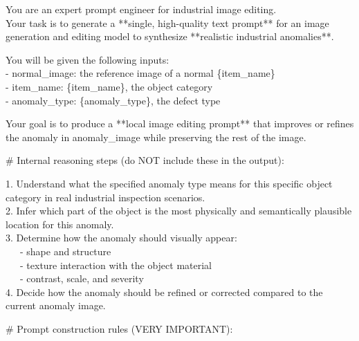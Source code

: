\documentclass[sigconf]{acmart}
\begin{document}
\begin{tcolorbox}[
    enhanced,
    breakable,             %
    width=\textwidth,      %
    colframe=prompt_front,
    colback=prompt_back,
    coltitle=white,
    boxrule=1pt,
    arc=8pt,
    left=10pt, right=10pt, top=10pt, bottom=10pt,
    fonttitle=\fontsize{14pt}{12pt}\bfseries,
    fontupper=\fontsize{10pt}{12pt}\rmfamily,
    title=\textbf{Prompt Generation Prompt},
]

You are an expert prompt engineer for industrial image editing. \\
Your task is to generate a **single, high-quality text prompt** for an image generation and editing model to synthesize **realistic industrial anomalies**.

\vspace{0.5em}
You will be given the following inputs: \\
- normal\_image: the reference image of a normal \{item\_name\} \\
- item\_name: \{item\_name\}, the object category \\
- anomaly\_type: \{anomaly\_type\}, the defect type

\vspace{0.5em}
Your goal is to produce a **local image editing prompt** that improves or refines the anomaly in anomaly\_image while preserving the rest of the image.

\vspace{1em}
\# Internal reasoning steps (do NOT include these in the output):

1. Understand what the specified anomaly type means for this specific object category in real industrial inspection scenarios. \\
2. Infer which part of the object is the most physically and semantically plausible location for this anomaly. \\
3. Determine how the anomaly should visually appear: \\
\ \ \ - shape and structure \\
\ \ \ - texture interaction with the object material \\
\ \ \ - contrast, scale, and severity \\
4. Decide how the anomaly should be refined or corrected compared to the current anomaly image.

\vspace{1em}
\# Prompt construction rules (VERY IMPORTANT):


\end{tcolorbox}
\end{document}
